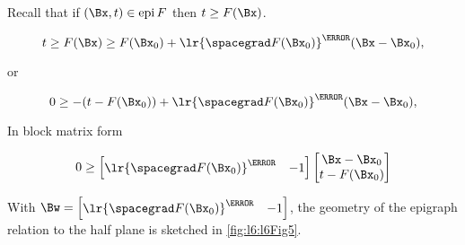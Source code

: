 Recall that if \( (\Bx, t) \in \epi F \) then \( t \ge F(\Bx) \).

\begin{dmath}\label{eqn:convexOptimizationLecture6:740}
t \ge F(\Bx) \ge F(\Bx_0) + \lr{\spacegrad F(\Bx_0) }^\T (\Bx - \Bx_0),
\end{dmath}

or

\begin{dmath}\label{eqn:convexOptimizationLecture6:760}
0 \ge
-(t - F(\Bx_0)) + \lr{\spacegrad F(\Bx_0) }^\T (\Bx - \Bx_0),
\end{dmath}

In block matrix form

\begin{dmath}\label{eqn:convexOptimizationLecture6:780}
0 \ge
\begin{bmatrix}
\lr{ \spacegrad F(\Bx_0) }^\T & -1
\end{bmatrix}
\begin{bmatrix}
\Bx - \Bx_0 \\
t - F(\Bx_0)
\end{bmatrix}
\end{dmath}

With \( \Bw =
\begin{bmatrix}
\lr{ \spacegrad F(\Bx_0) }^\T & -1
\end{bmatrix} \), the geometry of the epigraph relation to the half plane is sketched in \cref{fig:l6:l6Fig5}.


\EndArticle
